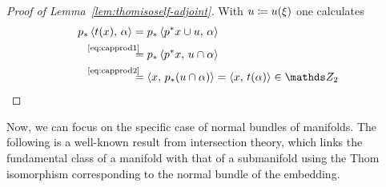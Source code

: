 \begin{proof}[Proof of Lemma~\ref{lem:thomisoself-adjoint}]
  With $u\coloneqq{u}(\xi)$ one calculates
  \begin{align*}
    \pf p\capped{\thomiso(x)}{\alpha}
    &= \pf p\capped{\pb p x \cup \U}{\alpha} \\
    &\equalsby{\eqref{eq:capprod1}}
      \pf p\capped{\pb p x}{\U\cap\alpha} \\
    &\equalsby{\eqref{eq:capprod2}}
      \capped{x}{\pf p(u\cap\alpha)}
      = \capped{x}{\thomiso (\alpha)} \in\Zmod2
      \qedhere
  \end{align*}
\end{proof}

Now, we can focus on the specific case of normal bundles of manifolds.
The following is a well-known result from intersection theory, which
links the fundamental class of a manifold with that of a submanifold
using the Thom isomorphism corresponding to the normal bundle of the
embedding.
